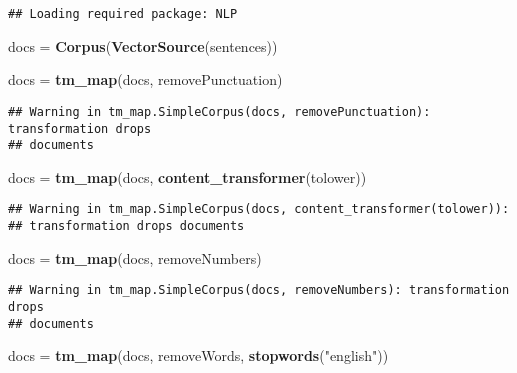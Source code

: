 \documentclass[
]{article}
\newenvironment{Shaded}{\begin{snugshade}}{\end{snugshade}}
\newcommand{\FunctionTok}[1]{\textcolor[rgb]{0.13,0.29,0.53}{\textbf{#1}}}
\newcommand{\NormalTok}[1]{#1}
\newcommand{\OtherTok}[1]{\textcolor[rgb]{0.56,0.35,0.01}{#1}}
\newcommand{\StringTok}[1]{\textcolor[rgb]{0.31,0.60,0.02}{#1}}
\begin{document}
\begin{verbatim}
## Loading required package: NLP
\end{verbatim}

\begin{Shaded}
\begin{Highlighting}[]
\NormalTok{docs }\OtherTok{=} \FunctionTok{Corpus}\NormalTok{(}\FunctionTok{VectorSource}\NormalTok{(sentences))}

\NormalTok{docs }\OtherTok{=} \FunctionTok{tm\_map}\NormalTok{(docs, removePunctuation)}
\end{Highlighting}
\end{Shaded}

\begin{verbatim}
## Warning in tm_map.SimpleCorpus(docs, removePunctuation): transformation drops
## documents
\end{verbatim}

\begin{Shaded}
\begin{Highlighting}[]
\NormalTok{docs }\OtherTok{=} \FunctionTok{tm\_map}\NormalTok{(docs, }\FunctionTok{content\_transformer}\NormalTok{(tolower))}
\end{Highlighting}
\end{Shaded}

\begin{verbatim}
## Warning in tm_map.SimpleCorpus(docs, content_transformer(tolower)):
## transformation drops documents
\end{verbatim}

\begin{Shaded}
\begin{Highlighting}[]
\NormalTok{docs }\OtherTok{=} \FunctionTok{tm\_map}\NormalTok{(docs, removeNumbers)}
\end{Highlighting}
\end{Shaded}

\begin{verbatim}
## Warning in tm_map.SimpleCorpus(docs, removeNumbers): transformation drops
## documents
\end{verbatim}

\begin{Shaded}
\begin{Highlighting}[]
\NormalTok{docs }\OtherTok{=} \FunctionTok{tm\_map}\NormalTok{(docs, removeWords, }\FunctionTok{stopwords}\NormalTok{(}\StringTok{"english"}\NormalTok{))}
\end{Highlighting}
\end{Shaded}
\end{document}
